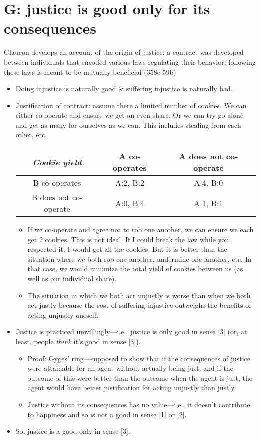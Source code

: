 \documentclass[oneside]{article}
\begin{document}
\section*{G: justice is good only for its consequences}

Glaucon develops an account of the origin of justice: a contract was developed between individuals that encoded various laws regulating their behavior; following these laws is meant to be mutually beneficial (358e-59b)

\begin{itemize}
\item{Doing injustice is naturally good \& suffering injustice is naturally bad.}
\item Justification of contract: assume there a limited number of cookies. We can either co-operate and ensure we get an even share. Or we can try go alone and get as many for ourselves as we can. This includes stealing from each other, etc. \begin{center}
\begin{tabular}{ |c|c|c| } 
 \hline
 \emph{Cookie yield}	 & A co-operates   & A does not co-operate  \\ \hline 
 B co-operates & A:2, B:2 & A:4, B:0 \\ 
 B does not co-operate & A:0, B:4 & A:1, B:1 \\ 
 \hline
\end{tabular}
\end{center}

\begin{itemize}
\item If we co-operate and agree not to rob one another, we can ensure we each get 2 cookies. This is not ideal. If I could break the law while you respected it, I would get all the cookies. But it is better than the situation where we both rob one another, undermine one another, etc. In that case, we would minimize the total yield of cookies between us (as well as our individual share).
\item{The situation in which we both act unjustly is worse than when we both act justly because the cost of suffering injustice outweighs the benefits of acting unjustly oneself.}
\end{itemize}
\item Justice is practiced unwillingly---i.e., justice is only good in sense [3] (or, at least, people \emph{think} it's good in sense [3]).
\begin{itemize}\item{Proof: Gyges' ring---supposed to show that if the consequences of justice were attainable for an agent without actually being just, and if the outcome of this were better than the outcome when the agent is just, the agent would have better justification for acting unjustly than justly.}
\item {Justice without its consequences has no value---i.e., it doesn't contribute to happiness and so is not a good in sense [1] or [2].}
\end{itemize}
\item So, justice is a good only in sense [3]. 
\end{itemize}
\end{document}
